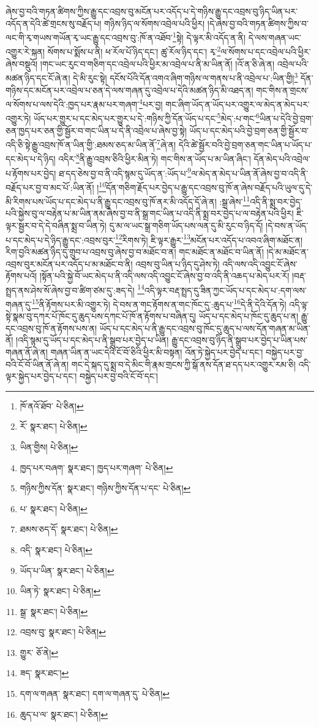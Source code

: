 ཞེས་བྱ་བའི་གཏན་ཚིགས་ཀྱིས་རྒྱུ་དང་འབྲས་བུ་མངོན་པར་འདོད་པ་དེ་གཉིས་རྒྱུ་དང་འབྲས་བུ་ཉིད་ཡིན་པར་འདོད་ན་དེའི་ཚེ་གྲངས་སུ་བརྗོད་པ། གཉིས་ཉིད་ལ་སོགས་འབྲེལ་པའི་ཕྱིར། །དེ་ཞེས་བྱ་བའི་གཏན་ཚིགས་ཀྱིས་བ་ལང་གི་རྭ་གཡས་གཡོན་རྭ་ཡང་རྒྱུ་དང་འབྲས་བུ་:ཁོ་ན་འཐོབ་\footnote{ཁོ་ནའོ་ཐོབ་  པེ་ཅིན། }སྟེ། དེ་ལྟར་མི་འདོད་ན་ནི། དེ་ལས་གཞན་ཡང་འགྱུར་རེ་སྐན། སོགས་པ་སྨོས་པ་ནི། ཕ་རོལ་པོ་ཉིད་དང་། ཚུ་རོལ་ཉིད་དང་། རྭ་\footnote{རོ་  སྣར་ཐང་།  པེ་ཅིན། }ལ་སོགས་པ་དང་འབྲེལ་པའི་ཕྱིར་ཞེས་བསྡུའོ། །གང་ཡང་རུང་བ་གཅིག་དང་འབྲེལ་པའི་ཕྱིར་མ་འབྲེལ་པ་ནི་མ་ཡིན་ནོ། །འོ་ན་ཅི་ཞེ་ན། འབྲེལ་པའི་མཚན་ཉིད་དང་ངོ་ཞེ་ན། དེ་མི་རུང་སྟེ། དངོས་པོའི་དོན་འགའ་ཞིག་གཉིས་ལ་གནས་པ་ནི་འབྲེལ་པ་:ཡིན་གྱི།\footnote{ཡིན་གྱིས།  པེ་ཅིན། } དོན་གཉིས་དང་མངོན་པར་འབྲེལ་པ་ཅན་དེ་ལས་གཞན་དུ་འབྲེལ་པ་དེའི་མཚན་ཉིད་མི་འཐད་ན། གང་གིས་ན་གྲངས་ལ་སོགས་པ་ལས་དེའི་:ཁྱད་པར་རྣམ་པར་གཞག་\footnote{ཁྱད་པར་བཞག་  སྣར་ཐང་། ཁྱད་པར་གཞག་  པེ་ཅིན། }པར་བྱ། གང་ཞིག་ཡོད་ན་ཡོད་པར་འགྱུར་ལ་མེད་ན་མེད་པར་འགྱུར་ཏེ། ཡོད་པར་གྱུར་པ་དང་མེད་པར་གྱུར་པ་དེ་:གཉིས་ཀྱི་དོན་ཡོད་པ་དང་\footnote{གཉིས་ཀྱིས་དོན་  སྣར་ཐང་། གཉིས་ཀྱིས་དོན་པ་དང་  པེ་ཅིན། }མེད་:པ་གང་\footnote{པ་  སྣར་ཐང་།  པེ་ཅིན། }ཡིན་པ་དེའི་བྱེ་བྲག་ཅན་ཁྱད་པར་ཅན་གྱི་སྦྱོར་བ་གང་ཡིན་པ་དེ་ནི་འབྲེལ་པ་ཞེས་བྱ་སྟེ། ཡོད་པ་དང་མེད་པའི་བྱེ་བྲག་ཅན་གྱི་སྦྱོར་བ་འདི་ཅི་སྟེ་རྒྱུ་འབྲས་ཁོ་ན་ཡིན་གྱི་:ཐམས་ཅད་མ་ཡིན་ནོ་\footnote{ཐམས་ཅད་དོ་  སྣར་ཐང་།  པེ་ཅིན། }ཞེ་ན། དེའི་ཚེ་སྦྱོར་བའི་བྱེ་བྲག་ཅན་གང་ཡིན་པ་ཡོད་པ་དང་མེད་པ་དེ་ཉིད། འདིར་\footnote{འདི་  སྣར་ཐང་།  པེ་ཅིན། }ནི་རྒྱུ་འབྲས་ཅིའི་ཕྱིར་མིན་ཏེ། གང་གིས་ན་ཡོད་པ་མ་ཡིན་ཞིང་། དོན་མེད་པའི་འབྲེལ་པ་རྟོགས་པར་བྱེད། ཐ་དད་ཅེས་བྱ་བ་ནི་འདི་སྙམ་དུ་ཡོད་ན་:ཡོད་པ་\footnote{ཡོད་པ་ཡིན་  སྣར་ཐང་།  པེ་ཅིན། }ལ་མེད་ན་མེད་པ་ཡིན་ནོ་ཞེས་བྱ་བ་འདི་ནི་བརྗོད་པར་བྱ་བ་མང་པོ་:ཡིན་ནོ། །\footnote{ཡིན་ཏེ་  སྣར་ཐང་།  པེ་ཅིན། }དོན་གཅིག་རྗོད་པར་བྱེད་པ་རྒྱུ་དང་འབྲས་བུ་ཁོ་ན་ཞེས་བརྗོད་པའི་ཡུལ་དུ་དེ་མི་རིགས་པས་ཡོད་པ་དང་མེད་པ་ནི་རྒྱུ་དང་འབྲས་བུ་ཁོ་ནར་མི་འདོད་དོ་ཞེ་ན། :སྒྲ་ཞེས་\footnote{སྒྲ་  སྣར་ཐང་།  པེ་ཅིན། }འདི་ནི་སྨྲ་བར་བྱེད་པའི་སྐྱེས་བུ་ལ་བརྟེན་པ་མ་ཡིན་ནམ་ཞེས་བྱ་བ་ནི་སྒྲ་གང་ཡིན་པ་འདི་ནི་སྨྲ་བར་བྱེད་པ་ལ་བརྟེན་པའི་ཕྱིར། ཇི་ལྟར་སྦྱར་བ་དེ་དེ་བཞིན་སྨྲ་བ་ཡིན་ཏེ། དུ་མ་ལ་ཡང་སྒྲ་གཅིག་ཡོད་པས་ལན་དུ་མི་རུང་བ་ཉིད་དོ། །དེ་བས་ན་ཡོད་པ་དང་མེད་པ་དེ་ཉིད་རྒྱུ་དང་:འབྲས་བུར་\footnote{འབྲས་བུ་  སྣར་ཐང་།  པེ་ཅིན། }རིགས་ཏེ། ཇི་ལྟར་རྒྱུར་\footnote{གྱུར་  ཅོ་ནེ། }མངོན་པར་འདོད་པ་འབའ་ཞིག་མཐོང་ན། རིག་བྱའི་མཚན་ཉིད་དུ་གྲུབ་པ་འབྲས་བུ་ཞེས་བྱ་བ་མཐོང་བ་ན། གང་མཐོང་ན་མཐོང་བ་ཡིན་ནོ། །དེ་མ་མཐོང་ན་འབྲས་བུར་མངོན་པར་འདོད་པ་མ་མཐོང་བ་ནི། འབྲས་བུ་ཡིན་པ་ཉིད་དུ་ཤེས་ཏེ། འདི་ལས་འདི་འབྱུང་ངོ་ཞེས་རྟོགས་པའོ། །སྟོན་པའི་སྐྱེ་བོ་ཡང་མེད་པ་ནི་འདི་ལས་འདི་འབྱུང་ངོ་ཞེས་བྱ་བ་འདི་ནི་འཆད་པ་མེད་པར་རོ། །བརྡ་སྤྲད་ནས་ཤེས་སོ་ཞེས་བྱ་བ་ཚིག་ཙམ་དུ་:ཟད་དེ། \footnote{ཟད་  སྣར་ཐང་། }འདི་ལྟར་བརྡ་སྤྲད་དུ་ཟིན་ཀྱང་ཡོད་པ་དང་མེད་པ་:དག་ལས་གཞན་དུ་\footnote{དག་ལ་གཞན་  སྣར་ཐང་། དག་ལ་གཞན་དུ་  པེ་ཅིན། }ནི་རྟོགས་པར་མི་འགྱུར་ཏེ། དེ་བས་ན་གང་རྟོགས་ན་གང་ཁོང་དུ་:ཆུད་པ་\footnote{ཆུད་པ་ལ་  སྣར་ཐང་།  པེ་ཅིན། }དེ་ནི་དེའི་དོན་ཏེ། འདི་ལྟ་སྟེ་སྣམ་བུ་དཀར་པོ་ཁོང་དུ་ཆུད་པས་དཀང་པོ་ཁོ་ན་རྟོགས་པ་བཞིན་དུ། ཡོད་པ་དང་མེད་པ་ཁོང་དུ་ཆུད་པ་ན། རྒྱུ་དང་འབྲས་བུ་ཁོ་ན་རྟོགས་པས་ན། ཡོད་པ་དང་མེད་པ་ནི་རྒྱུ་དང་འབྲས་བུ་ཁོང་དུ་ཆུད་པ་ལས་དོན་གཞན་མ་ཡིན་ནོ། །འདི་སྙམ་དུ་ཡོད་པ་དང་མེད་པ་ནི་སྒྲུབ་པར་བྱེད་པ་ཡིན། རྒྱུ་དང་འབྲས་བུ་ཉིད་ནི་སྒྲུབ་པར་བྱེད་པ་ཡིན་པས་གཞན་ནོ་ཞེ་ན། གཞན་ཡིན་ན་ཡང་དེའི་ངོ་བོ་ཅིའི་ཕྱིར་མི་བསྟན། འོན་ཏེ་སྐྱེད་པར་བྱེད་པ་དང་། བསྐྱེད་པར་བྱ་བའི་ངོ་བོ་ཡིན་ནོ་ཞེ་ན། གང་དེ་སྐད་དུ་སྨྲ་བ་དེ་མིང་གི་རྣམ་གྲངས་ཀྱི་སྒོ་ནས་དོན་ཐ་དད་པར་འགྱུར་རམ་ཅི། འདི་ལྟར་སྐྱེད་པར་བྱེད་པ་དང་། བསྐྱེད་པར་བྱ་བའི་ངོ་བོ་དང་། 